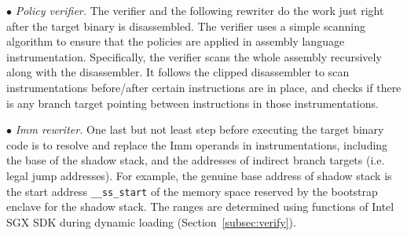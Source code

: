 \vspace{2pt}\noindent$\bullet$\textit{ Policy verifier.}\label{subsec-policyverifer}
The verifier and the following rewriter do the work just right after the target binary is disassembled. The verifier uses a simple scanning algorithm to ensure that the policies are applied in assembly language instrumentation. 
Specifically, the verifier scans the whole assembly recursively along with the disassembler. It follows the clipped disassembler to scan instrumentations before/after certain instructions are in place, and checks if there is any branch target pointing between instructions in those instrumentations.

\vspace{2pt}\noindent$\bullet$\textit{ Imm rewriter.}\label{subsec:immrewriter} One last but not least step before executing the target binary code is to resolve and replace the Imm operands in instrumentations, including the base of the shadow stack, and the addresses of indirect branch targets (i.e. legal jump addresses). For example, the genuine base address of shadow stack is the start address \verb|__ss_start| of the memory space reserved by the bootstrap enclave for the shadow stack. The ranges are determined using functions of Intel SGX SDK during dynamic loading (Section~\ref{subsec:verify}).

